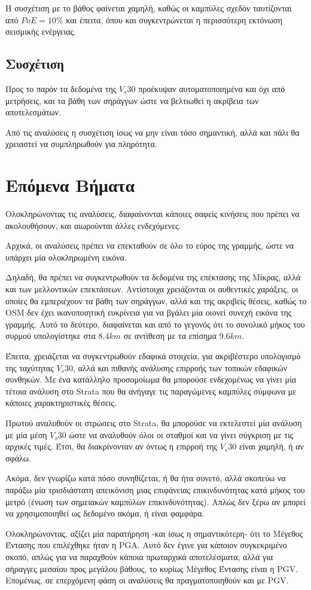 \documentclass{report}
\begin{document}
Η συσχέτιση με το βάθος φαίνεται χαμηλή, καθώς οι καμπύλες σχεδόν ταυτίζονται από $PoE = 10\%$ και έπειτα, όπου και συγκεντρώνεται η περισσότερη εκτόνωση σεισμικής ενέργειας.

\subsection{Συσχέτιση}
Προς το παρόν τα δεδομένα της $V_s30$ προέκυψαν αυτοματοποιημένα και όχι από μετρήσεις, και τα βάθη των σηράγγων ώστε να βελτιωθεί η ακρίβεια των αποτελεσμάτων.

Από τις αναλύσεις η συσχέτιση ίσως να μην είναι τόσο σημαντική, αλλά και πάλι θα χρειαστεί να συμπληρωθούν για πληρότητα.

\section{Επόμενα Βήματα}
Ολοκληρώνοντας τις αναλύσεις, διαφαίνονται κάποιες σαφείς κινήσεις που πρέπει να ακολουθήσουν, και αιωρούνται άλλες ενδεχόμενες.

Αρχικά, οι αναλύσεις πρέπει να επεκταθούν σε όλο το εύρος της γραμμής, ώστε να υπάρχει μία ολοκληρωμένη εικόνα.

Δηλαδή, θα πρέπει να συγκεντρωθούν τα δεδομένα της επέκτασης της Μίκρας, αλλά και των μελλοντικών επεκτάσεων. Αντίστοιχα χρειάζονται οι αυθεντικές χαράξεις, οι οποίες θα εμπεριέχουν τα βάθη των σηράγγων, αλλά και της ακριβείς θέσεις, καθώς το OSM δεν έχει ικανοποιητική ευκρίνεια για να βγάλει μία οιονεί συνεχή εικόνα της γραμμής. Αυτό το δεύτερο, διαφαίνεται και από το γεγονός ότι το συνολικό μήκος του συρμού υπολογίστηκε στα $8.4km$ σε αντίθεση με τα επίσημα $9.6km$.

Έπειτα, χρειάζεται να συγκεντρωθούν εδαφικά στοιχεία, για ακριβέστερο υπολογισμό της ταχύτητας $V_s30$, αλλά και πιθανής ανάλυσης επιρροής των τοπικών εδαφικών συνθηκών. Με ένα κατάλληλο προσομοίωμα θα μπορούσε ενδεχομένως να γίνει μία τέτοια ανάλυση στο Strata που θα ανήγαγε τις παραγώμενες καμπύλες σύμφωνα με κάποιες χαρακτηριστικές θέσεις.

Πρωτού αναλυθούν οι στρώσεις στο Strata, θα μπορούσε να εκτελεστεί μία ανάλυση με μία μέση $V_s30$ ώστε να αναλυθούν όλοι οι σταθμοί και να γίνει σύγκριση με τις αρχικές τιμές. Έτσι, θα διακρίνονταν αν όντως η επιρροή της $V_s30$ είναι χαμηλή, ή αν σφάλω.

Ακόμα, δεν γνωρίζω κατά πόσο συνηθίζεται, ή θα ήτα συνετό, αλλά σκοπεύω να παράξω μία τρισδιάστατη απεικόνιση μιας επιφάνειας επικινδυνότητας κατά μήκος του μετρό (ένωση των σημειακών καμπύλων επικινδυνότητας). Απλώς δεν ξέρω αν μπορεί να χρησιμοποιηθεί ως δεδομένο ακόμα, ή είναι φαμφάρα.

Ολοκληρώνοντας, αξίζει μία παρατήρηση -και ίσως η σημαντικότερη- ότι το Μέγεθος Έντασης που επιλέχθηκε ήταν η PGA. Αυτό δεν έγινε για κάποιον συγκεκριμένο σκοπό, απλώς για να παραχθούν κάποια πρωταρχικά αποτελέσματα, αλλά για σήραγγες μεσαίου προς μεγάλου βάθους, το κυρίως Μέγεθος Έντασης είναι η PGV. Επομένως, σε επερχόμενη φάση οι αναλύσεις θα πραγματοποιηθούν και με PGV.
\end{document}
